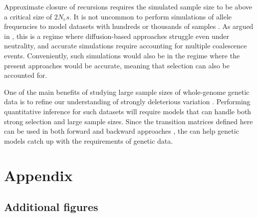 \documentclass[review]{elsarticle}
\begin{document}
Approximate closure of recursions requires the simulated sample size to be above a critical size of $2N_e s.$ 
It is not uncommon to perform simulations of allele frequencies to model datasets with hundreds or 
thousands of samples \citep{Gravel:2011bg, Tennessen:2012ck}. 
 As argued in \citep{BhaskarEtAl2014},  this is a regime where diffusion-based approaches 
 struggle even under neutrality, and accurate simulations require accounting for multiple coalescence events.  
 Conveniently, such simulations would also be in the regime where the present approaches would be accurate, 
 meaning that selection can also be accounted for.

 

One of the main benefits of studying large sample sizes of whole-genome
genetic data is to refine our understanding of strongly deleterious variation \cite{karczewski2020mutational}. Performing 
quantitative inference for such datasets will require models that can handle both strong selection and large sample sizes.  
Since the transition matrices defined here can be used in both forward \citep{JouganousEtAl2017} 
and backward approaches \cite{KammEtAl2017}, the can help genetic models catch up with the requirements of genetic data.




\section{Appendix}

\subsection{Additional figures}
\label{subsec_apx_figures}
\end{document}
